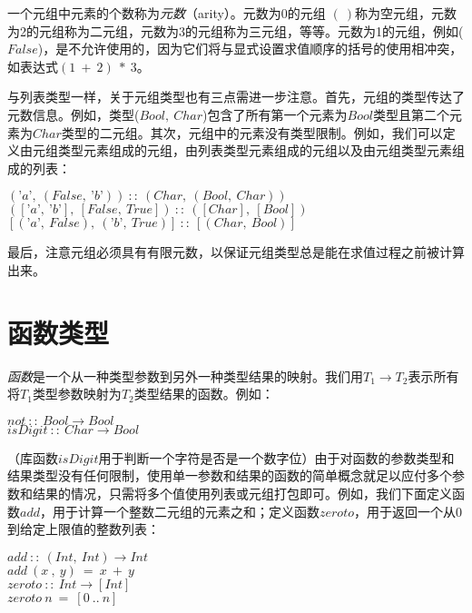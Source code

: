 一个元组中元素的个数称为\textit{元数}（arity）。元数为0的元组
$(~)$称为空元组，元数为2的元组称为二元组，元数为3的元组称为三元组，等等。元数为1的元组，例如($False$)，是不允许使用的，因为它们将与显式设置求值顺序的括号的使用相冲突，如表达式$(1~+~2)~*~3$。

与列表类型一样，关于元组类型也有三点需进一步注意。首先，元组的类型传达了元数信息。例如，类型($Bool,
~Char$)包含了所有第一个元素为$Bool$类型且第二个元素为$Char$类型的二元组。其次，元组中的元素没有类型限制。例如，我们可以定义由元组类型元素组成的元组，由列表类型元素组成的元组以及由元组类型元素组成的列表：

\noindent\hspace*{1cm} $(’a’,~(False,~’b’))~::~(Char,~(Bool,~Char))$\\
\hspace*{1cm} $([’a’,~’b’],~[False,~True])~::~([Char],~[Bool])$\\
\hspace*{1cm} $[(’a’,~False),~(’b’,~True)]~::~[(Char,~Bool)]$

最后，注意元组必须具有有限元数，以保证元组类型总是能在求值过程之前被计算出来。

\section{函数类型}
\textit{函数}是一个从一种类型参数到另外一种类型结果的映射。我们用$T_1
\rightarrow T_2$表示所有将$T_1$类型参数映射为$T_2$类型结果的函数。例如：

\noindent\hspace*{1cm} $not~::~Bool \rightarrow Bool$\\
\hspace*{1cm} $isDigit~::~Char \rightarrow Bool$

（库函数$isDigit$用于判断一个字符是否是一个数字位）由于对函数的参数类型和结果类型没有任何限制，使用单一参数和结果的函数的简单概念就足以应付多个参数和结果的情况，只需将多个值使用列表或元组打包即可。例如，我们下面定义函数$add$，用于计算一个整数二元组的元素之和；定义函数$zeroto$，用于返回一个从$0$到给定上限值的整数列表：

\noindent\hspace*{1cm} $add~::~(Int,~Int) \rightarrow Int$\\
\hspace*{1cm} $add~(x~,~y)~=~x~+~y$\\
\hspace*{1cm} $zeroto~::~Int \rightarrow [Int]$\\
\hspace*{1cm} $zeroto~n~=~[0~. .~n]$


